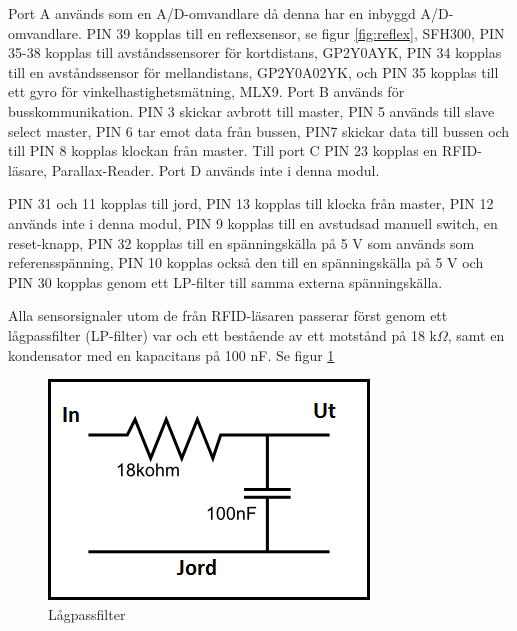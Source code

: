 \documentclass[a4paper,12pt,fleqn]{article}
\begin{document}
Port A används som en A/D-omvandlare då denna har en inbyggd A/D-omvandlare. PIN 39 kopplas till en reflexsensor, se figur \ref{fig:reflex}, SFH300, PIN 35-38 kopplas till avståndssensorer för kortdistans, GP\-2Y\-0A\-YK, 
PIN 34 kopplas till en avståndssensor för mellandistans, GP2Y0A02YK, och PIN 35 kopplas till ett gyro för vinkelhastighetsmätning, ML\-X9. Port B används för busskommunikation. PIN 3 skickar avbrott till master, PIN 5 används till slave select master, PIN 6 tar emot data från bussen, PIN7 skickar data till bussen och till PIN 8 kopplas klockan från master. Till port C PIN 23 kopplas en RFID-läsare, Parallax-Reader. Port D används inte i denna modul. 

PIN 31 och 11 kopplas till jord, PIN 13 kopplas till klocka från master, PIN 12 används inte i denna modul, PIN 9 kopplas till en avstudsad manuell switch, en reset-knapp, PIN 32 kopplas till en spänningskälla på 5 V som används som referensspänning, PIN 10 kopplas också den till en spänningskälla på 5 V och PIN 30 kopplas genom ett LP-filter till samma externa spänningskälla.

Alla sensorsignaler utom de från RFID-läsaren passerar först genom ett lågpassfilter (LP-filter) var och ett bestående av ett motstånd på 18 k$\Omega$, samt en kondensator med en kapacitans på 100 nF. Se figur \ref{fig:lpfilter}

\begin{figure}[htp] %
  \begin{center}
  \includegraphics[keepaspectratio=true,width=0.3\linewidth]{bilder/lp-filter2}  %
  \end{center}
  \caption{Lågpassfilter} %
  \label{fig:lpfilter}
\end{figure}

\end{document}
